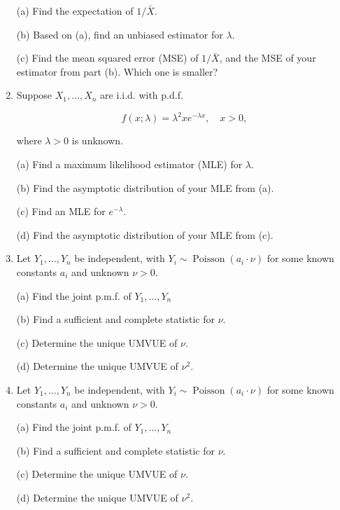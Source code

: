 \documentclass{extarticle}
\begin{document}
\begin{enumerate}
(a) Find the expectation of $1 / \bar{X}$.

(b) Based on (a), find an unbiased estimator for $\lambda$.

(c) Find the mean squared error (MSE) of $1 / \bar{X}$, and the MSE of your estimator from part (b). Which one is smaller?



\item 
Suppose $X_1, \ldots, X_n$ are i.i.d. with p.d.f.


$$f(x ; \lambda)=\lambda^2 x e^{-\lambda x}, \quad x>0,$$

where $\lambda>0$ is unknown.

(a) Find a maximum likelihood estimator (MLE) for $\lambda$.

(b) Find the asymptotic distribution of your MLE from (a).

(c) Find an MLE for $e^{-\lambda}$.

(d) Find the asymptotic distribution of your MLE from (c).


\item
Let $Y_1, \ldots, Y_n$ be independent, with $Y_i \sim \operatorname{Poisson}\left(a_i \cdot \nu\right)$ for some known constants $a_i$ and unknown $\nu>0$.

(a) Find the joint p.m.f. of $Y_1, \ldots, Y_n$

(b) Find a sufficient and complete statistic for $\nu$.

(c) Determine the unique UMVUE of $\nu$.

(d) Determine the unique UMVUE of $\nu^2$.


\item 

Let $Y_1, \ldots, Y_n$ be independent, with $Y_i \sim \operatorname{Poisson}\left(a_i \cdot \nu\right)$ for some known constants $a_i$ and unknown $\nu>0$.

(a) Find the joint p.m.f. of $Y_1, \ldots, Y_n$

(b) Find a sufficient and complete statistic for $\nu$.

(c) Determine the unique UMVUE of $\nu$.

(d) Determine the unique UMVUE of $\nu^2$.

\end{enumerate}
\end{document}

